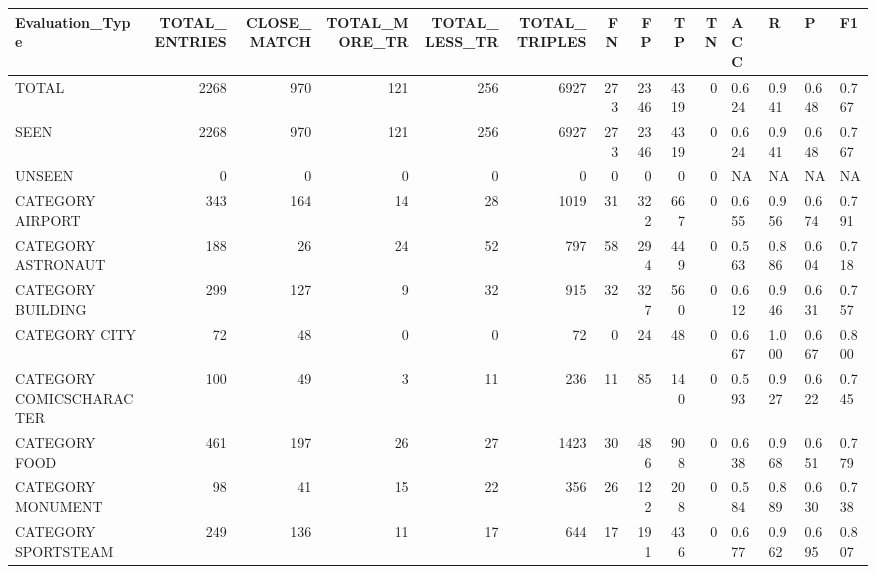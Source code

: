\begin{tabular}{lrrrrrrrrrllll}
\hline
 Evaluation\_Type          &   TOTAL\_ENTRIES &   CLOSE\_MATCH &   TOTAL\_MORE\_TR &   TOTAL\_LESS\_TR &   TOTAL\_TRIPLES &   FN &   FP &   TP &   TN & ACC   & R     & P     & F1    \\
\hline
 TOTAL                    &            2268 &           970 &             121 &             256 &            6927 &  273 & 2346 & 4319 &    0 & 0.624 & 0.941 & 0.648 & 0.767 \\
 SEEN                     &            2268 &           970 &             121 &             256 &            6927 &  273 & 2346 & 4319 &    0 & 0.624 & 0.941 & 0.648 & 0.767 \\
 UNSEEN                   &               0 &             0 &               0 &               0 &               0 &    0 &    0 &    0 &    0 & NA    & NA    & NA    & NA    \\
 CATEGORY AIRPORT         &             343 &           164 &              14 &              28 &            1019 &   31 &  322 &  667 &    0 & 0.655 & 0.956 & 0.674 & 0.791 \\
 CATEGORY ASTRONAUT       &             188 &            26 &              24 &              52 &             797 &   58 &  294 &  449 &    0 & 0.563 & 0.886 & 0.604 & 0.718 \\
 CATEGORY BUILDING        &             299 &           127 &               9 &              32 &             915 &   32 &  327 &  560 &    0 & 0.612 & 0.946 & 0.631 & 0.757 \\
 CATEGORY CITY            &              72 &            48 &               0 &               0 &              72 &    0 &   24 &   48 &    0 & 0.667 & 1.000 & 0.667 & 0.800 \\
 CATEGORY COMICSCHARACTER &             100 &            49 &               3 &              11 &             236 &   11 &   85 &  140 &    0 & 0.593 & 0.927 & 0.622 & 0.745 \\
 CATEGORY FOOD            &             461 &           197 &              26 &              27 &            1423 &   30 &  486 &  908 &    0 & 0.638 & 0.968 & 0.651 & 0.779 \\
 CATEGORY MONUMENT        &              98 &            41 &              15 &              22 &             356 &   26 &  122 &  208 &    0 & 0.584 & 0.889 & 0.630 & 0.738 \\
 CATEGORY SPORTSTEAM      &             249 &           136 &              11 &              17 &             644 &   17 &  191 &  436 &    0 & 0.677 & 0.962 & 0.695 & 0.807 \\

\end{tabular}
